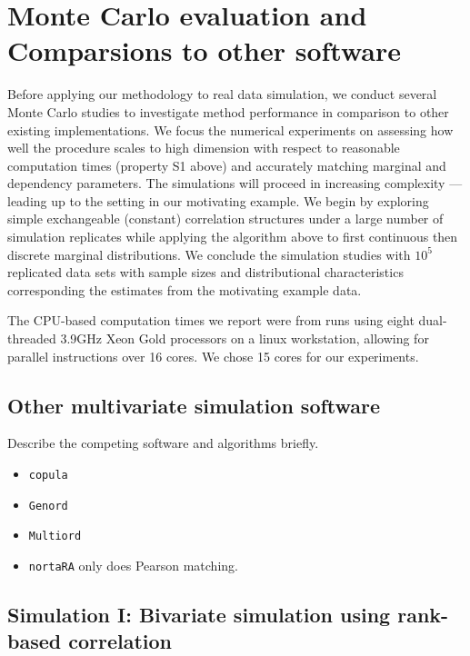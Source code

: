\documentclass[
]{article}
\providecommand{\tightlist}{%
  \setlength{\itemsep}{0pt}\setlength{\parskip}{0pt}}
\begin{document}
\hypertarget{monte-carlo-evaluation-and-comparsions-to-other-software}{%
\section{Monte Carlo evaluation and Comparsions to other software}\label{monte-carlo-evaluation-and-comparsions-to-other-software}}

Before applying our methodology to real data simulation, we conduct several Monte Carlo studies to investigate method performance in comparison to other existing implementations. We focus the numerical experiments on assessing how well the procedure scales to high dimension with respect to reasonable computation times (property S1 above) and accurately matching marginal and dependency parameters. The simulations will proceed in increasing complexity --- leading up to the setting in our motivating example. We begin by exploring simple exchangeable (constant) correlation structures under a large number of simulation replicates while applying the algorithm above to first continuous then discrete marginal distributions. We conclude the simulation studies with \(10^5\) replicated data sets with sample sizes and distributional characteristics corresponding the estimates from the motivating example data.

The CPU-based computation times we report were from runs using eight dual-threaded 3.9GHz
Xeon Gold processors on a linux workstation, allowing for parallel instructions
over 16 cores. We chose 15 cores for our experiments.

\hypertarget{other-multivariate-simulation-software}{%
\subsection{Other multivariate simulation software}\label{other-multivariate-simulation-software}}

Describe the competing software and algorithms briefly.

\begin{itemize}
\tightlist
\item
  \texttt{copula}
\item
  \texttt{Genord}
\item
  \texttt{Multiord}
\item
  \texttt{nortaRA} only does Pearson matching.
\end{itemize}

\hypertarget{simulation-i-bivariate-simulation-using-rank-based-correlation}{%
\subsection{Simulation I: Bivariate simulation using rank-based correlation}\label{simulation-i-bivariate-simulation-using-rank-based-correlation}}
\end{document}
